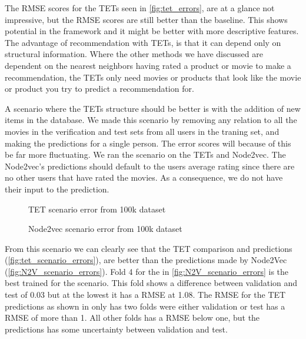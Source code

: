The RMSE scores for the TETs seen in \autoref{fig:tet_errors}, are at a glance not impressive, but the RMSE scores are still better than the baseline. 
This shows potential in the framework and it might be better with more descriptive features. The advantage of recommendation with TETs, is that it can depend only on structural information.
Where the other methods we have discussed are dependent on the nearest neighbors having rated a product or movie to make a recommendation, the TETs only need movies or products that look like the movie or product you try to predict a recommendation for.

A scenario where the TETs structure should be better is with the addition of new items in the database.
We made this scenario by removing any relation to all the movies in the verification and test sets from all users in the traning set, and making the predictions for a single person.
The error scores will because of this be far more fluctuating.
We ran the scenario on the TETs and Node2vec.
The Node2vec's predictions should default to the users average rating since there are no other users that have rated the movies. As a consequence, we do not have their input to the prediction.

\begin{figure}[H]
	\centering
	\begin{adjustbox}{width=0.5\textwidth}
		
	\end{adjustbox}
	\caption{TET scenario error from 100k dataset}
	\label{fig:tet_scenario_errors}
\end{figure}

\begin{figure}[H]
	\centering
	\begin{adjustbox}{width=0.5\textwidth}
		
	\end{adjustbox}
	\caption{Node2vec scenario error from 100k dataset}
	\label{fig:N2V_scenario_errors}
\end{figure}

From this scenario we can clearly see that the TET comparison and predictions (\autoref{fig:tet_scenario_errors}), are better than the predictions made by Node2Vec (\autoref{fig:N2V_scenario_errors}).
Fold 4 for the in \autoref{fig:N2V_scenario_errors} is the best trained for the scenario.
This fold shows a difference between validation and test of 0.03 but at the lowest it has a RMSE at 1.08.
The RMSE for the TET predictions  as shown in  only has two folds were either validation or test has a RMSE of more than 1.
All other folds has a RMSE below one, but the predictions has some uncertainty between validation and test.
